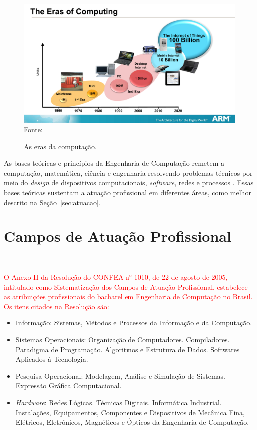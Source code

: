 \begin{figure}[H]
    \centering
    \caption{As eras da computação.}
    \label{fig:eras}
    \includegraphics[width=\textwidth]{enc/imagens/CompEras.pdf}
    Fonte:~\textcite{ARM2013}
\end{figure}


As bases teóricas e princípios da Engenharia de Computação remetem a computação, matemática, ciência e engenharia resolvendo problemas técnicos por meio do \textit{design} de dispositivos computacionais, \textit{software}, redes e processos \cite{CE2016}. Essas bases teóricas sustentam a atuação profissional em diferentes áreas, como melhor descrito na Seção~\ref{sec:atuacao}.


\section{Campos de Atuação Profissional}~\label{sec:atuacao}

\textcolor{red} {O Anexo II da Resolução do CONFEA n° 1010, de 22 de agosto de 2005, intitulado como Sistematização dos Campos de Atuação Profissional, estabelece as atribuições profissionais do bacharel em Engenharia de Computação no Brasil. Os itens citados na Resolução são:}
\begin{itemize}
    \item Informação: Sistemas, Métodos e Processos da Informação e da Computação.
    \item Sistemas Operacionais: Organização de Computadores. Compiladores.
    Paradigma de Programação. Algoritmos e Estrutura de Dados. Softwares Aplicados à Tecnologia.
    \item Pesquisa Operacional: Modelagem, Análise e Simulação de Sistemas. Expressão Gráfica Computacional.
    \item \textit{Hardware}: Redes Lógicas. Técnicas Digitais. Informática Industrial.
    Instalações, Equipamentos, Componentes e Dispositivos de Mecânica Fina, Elétricos, Eletrônicos, Magnéticos e Ópticos da Engenharia de Computação.
\end{itemize}


